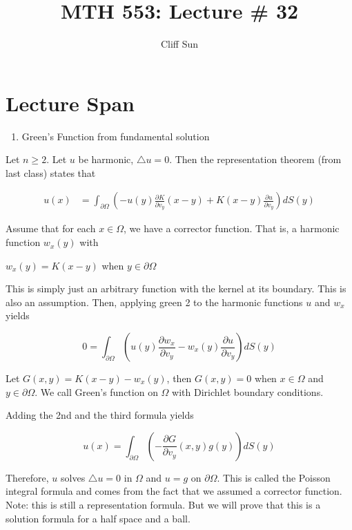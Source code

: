 \documentclass{article}
\title{MTH 553: Lecture \# 32}
\author{Cliff Sun}
\newtheorem{one minute paper}[theorem]{One Minute Paper}
\begin{document}
\maketitle

\section*{Lecture Span}
\begin{enumerate}
    \item Green's Function from fundamental solution
\end{enumerate}

Let $n \geq 2$. Let $u$ be harmonic, $\triangle u = 0$. Then the representation theorem (from last class) states that 

\begin{align*}
    u(x) &= \int_{\partial \Omega}\left( -u(y)\frac{\partial K}{\partial v_y}(x-y) + K(x-y)\frac{\partial u}{\partial v_y} \right)dS(y)
\end{align*}

Assume that for each $x \in \Omega$, we have a corrector function. That is, a harmonic function $w_x(y)$ with 

\begin{center}
    $w_x(y) = K(x-y)$ when $y \in \partial \Omega$
\end{center}

This is simply just an arbitrary function with the kernel at its boundary. This is also an assumption. Then, applying green 2 to the harmonic functions $u$ and $w_x$ yields 

\begin{equation}
    0 = \int_{\partial \Omega}(u(y)\frac{\partial w_x}{\partial v_y} - w_x(y)\frac{\partial u}{\partial v_y})dS(y)
\end{equation}

Let $G(x,y) = K(x-y) - w_x(y)$, then $G(x,y) = 0$ when $x \in \Omega$ and $y \in \partial \Omega$. We call Green's function on $\Omega$ with Dirichlet boundary conditions. 

Adding the 2nd and the third formula yields 

\begin{equation}
    u(x) = \int_{\partial \Omega}\left( -\frac{\partial G}{\partial v_y}(x,y)g(y) \right)dS(y)
\end{equation}

Therefore, $u$ solves $\triangle u = 0$ in $\Omega$ and $u= g$ on $\partial \Omega$. This is called the Poisson integral formula and comes from the fact that we assumed a corrector function. 
Note: this is still a representation formula. But we will prove that this is a solution formula for a half space and a ball. 
\end{document}
